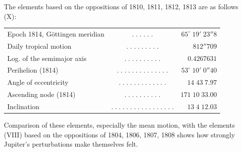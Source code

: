 \par\indent The elements based on the oppositions of 1810, 1811, 1812, 1813 are as follows (X):
\begin{center}\fontsize{9}{11}\selectfont\setlength{\tabcolsep}{2pt}\renewcommand{\arraystretch}{1.15}\begin{tabular}{lcr}
Epoch 1814, Göttingen meridian & $.\;.\;.\;.\;.\;.$ & $65^\circ\;19'\;23''8$\\
Daily tropical motion & $.\;.\;.\;.\;.\;.\;.\;.\;.$ & $812''709$\\
Log. of the semimajor axis & $.\;.\;.\;.\;.\;.\;.\;.\;.\;.$ & $0.4267631$\\
Perihelion (1814) & $.\;.\;.\;.\;.\;.\;.\;.\;.\;.\;.\;.\;.\;.$ & $53^\circ\;10'\;0''40$\\
Angle of eccentricity & $.\;.\;.\;.\;.\;.\;.\;.\;.\;.\;.\;.\;.$ & $14\;43\;7.97$\\
Ascending node (1814) & $.\;.\;.\;.\;.\;.\;.\;.\;.\;.$ & $171\;10\;33.00$\\
Inclination & $.\;.\;.\;.\;.\;.\;.\;.\;.\;.\;.\;.\;.\;.\;.\;.\;.$ & $13\;4\;12.03$\\
\end{tabular}\end{center}
\par\indent Comparison of these elements, especially the mean motion, with the elements (VIII) based on the oppositions of 1804, 1806, 1807, 1808 shows how strongly Jupiter’s perturbations make themselves felt.

